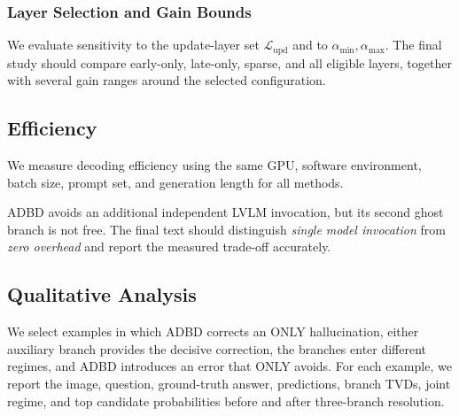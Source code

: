 \subsubsection{Layer Selection and Gain Bounds}

We evaluate sensitivity to the update-layer set $\mathcal{L}_{\mathrm{upd}}$ and to $\alpha_{\min},\alpha_{\max}$. The final study should compare early-only, late-only, sparse, and all eligible layers, together with several gain ranges around the selected configuration. 

\subsection{Efficiency}
\label{subsec:efficiency}

We measure decoding efficiency using the same GPU, software environment, batch size, prompt set, and generation length for all methods.

\begin{table}[t]
\centering
\small
\setlength{\tabcolsep}{3pt}
\caption{Inference efficiency relative to standard LLaVA and ONLY.}
\label{tab:efficiency}
\end{table}

ADBD avoids an additional independent LVLM invocation, but its second ghost branch is not free. The final text should distinguish \emph{single model invocation} from \emph{zero overhead} and report the measured trade-off accurately.

\subsection{Qualitative Analysis}

We select examples in which ADBD corrects an ONLY hallucination, either auxiliary branch provides the decisive correction, the branches enter different regimes, and ADBD introduces an error that ONLY avoids. For each example, we report the image, question, ground-truth answer, predictions, branch TVDs, joint regime, and top candidate probabilities before and after three-branch resolution.

